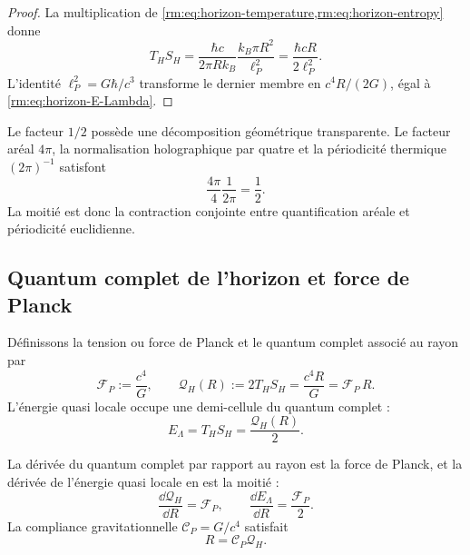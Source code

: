 \begin{proof}
La multiplication de \cref{rm:eq:horizon-temperature,rm:eq:horizon-entropy} donne
\[
 T_HS_H
 =\frac{\hbar c}{2\pi Rk_B}
  \frac{k_B\pi R^2}{\ell_P^2}
 =\frac{\hbar cR}{2\ell_P^2}.
\]
L’identité \(\ell_P^2=G\hbar/c^3\) transforme le dernier membre en \(c^4R/(2G)\), égal à \cref{rm:eq:horizon-E-Lambda}.
\end{proof}

Le facteur \(1/2\) possède une décomposition géométrique transparente. Le facteur aréal \(4\pi\), la normalisation holographique par quatre et la périodicité thermique \((2\pi)^{-1}\) satisfont
\begin{equation}
 \frac{4\pi}{4}\frac1{2\pi}=\frac12.
 \label{rm:eq:horizon-half-factor}
\end{equation}
La moitié est donc la contraction conjointe entre quantification aréale et périodicité euclidienne.

\subsection{Quantum complet de l’horizon et force de Planck}

Définissons la tension ou force de Planck et le quantum complet associé au rayon par
\begin{equation}
 \mathscr F_P:=\frac{c^4}{G},
 \qquad
 \boxed{
 \mathcal Q_H(R):=2T_HS_H
 =\frac{c^4R}{G}=\mathscr F_P\,R.}
 \label{rm:eq:horizon-full-quantum}
\end{equation}
L’énergie quasi locale occupe une demi-cellule du quantum complet :
\begin{equation}
 \boxed{E_\Lambda=T_HS_H=\frac{\mathcal Q_H(R)}2.}
 \label{rm:eq:horizon-half-quantum-general}
\end{equation}

\begin{proposition}
\label{rm:prop:horizon-compliance}
La dérivée du quantum complet par rapport au rayon est la force de Planck, et la dérivée de l’énergie quasi locale en est la moitié :
\begin{equation}
 \frac{\dd\mathcal Q_H}{\dd R}=\mathscr F_P,
 \qquad
 \frac{\dd E_\Lambda}{\dd R}=\frac{\mathscr F_P}{2}.
 \label{rm:eq:horizon-radial-derivatives}
\end{equation}
La compliance gravitationnelle \(\mathscr C_P=G/c^4\) satisfait
\begin{equation}
 R=\mathscr C_P\mathcal Q_H.
 \label{rm:eq:horizon-compliance-law}
\end{equation}
\end{proposition}

